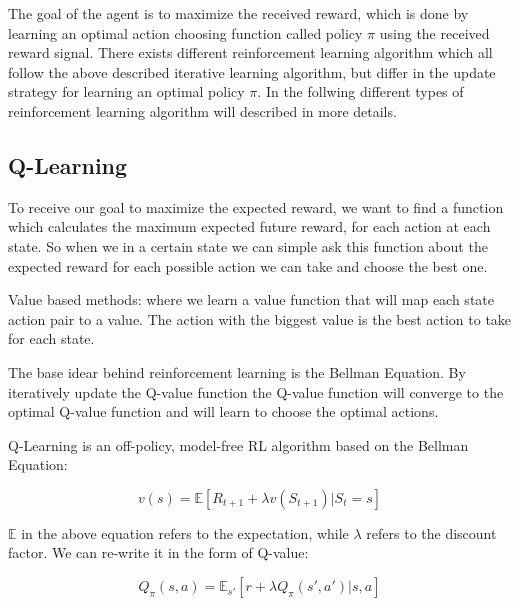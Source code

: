 
The goal of the agent is to maximize the received reward, which is done by learning an optimal action choosing function called policy $\pi$ using the received reward signal.
There exists different reinforcement learning algorithm which all follow the above described iterative learning algorithm, but differ in the update strategy for learning an optimal policy $\pi$. In the follwing different types of reinforcement learning algorithm will described in more details.

\subsection{Q-Learning}

To receive our goal to maximize the expected reward, we want to find a function which calculates the maximum expected future reward, for each action at each state. So when we in a certain state we can simple ask this function about the expected reward for each possible action we can take and choose the best one.

Value based methods: where we learn a value function that will map each state action pair to a value. The action with the biggest value is the best action to take for each state.

The base idear behind reinforcement learning is the Bellman Equation. By iteratively update the Q-value function the Q-value function will converge to the optimal Q-value function and will learn to choose the optimal actions. 

Q-Learning is an off-policy, model-free RL algorithm based on the Bellman Equation:

\begin{equation}
v(s) = \mathbb{E} [R_{t+1} + \lambda v(S_{t+1}) | S_t = s]
\end{equation}

$\mathbb{E}$ in the above equation refers to the expectation, while $\lambda$ refers to the discount factor. We can re-write it in the form of Q-value:

\begin{equation}
Q_{\pi} (s, a) =\mathbb{E}_{s'} [r + \lambda Q_\pi(s', a') | s, a]
\end{equation}


